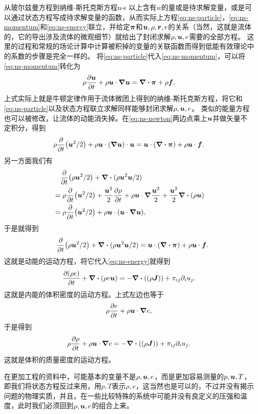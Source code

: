 \begin{back}{从玻尔兹曼方程到纳维-斯托克斯方程}{n-s}
    以上含有$w$的量或是待求解变量，或是可以通过状态方程写成待求解变量的函数，从而实际上方程\eqref{eq:ns-particle}，\eqref{eq:ns-momentum}和\eqref{eq:ns-energy}联立，并给定$\vb*{\pi}$和$\vb*{u}, \rho, \vb*{r}, e$的关系（当然，这就是流体的，它的导出涉及流体的微观细节）就给出了封闭求解$\rho, \vb*{u}, e$需要的全部方程。
    这里的过程和常规的场论计算中计算被积掉的变量的关联函数而得到低能有效理论中的系数的步骤是完全一样的。
    将\eqref{eq:ns-particle}代入\eqref{eq:ns-momentum}，可以将\eqref{eq:ns-momentum}转化为
    \begin{equation}
        \rho \pdv{\vb*{u}}{t} + \rho \vb*{u} \cdot \grad{\vb*{u}} = \div{\vb*{\pi}} + \rho \vb*{f},
        \label{eq:ns-newton}
    \end{equation}
    上式实际上就是牛顿定律作用于流体微团上得到的纳维-斯托克斯方程，将它和\eqref{eq:ns-particle}以及状态方程联立求解同样能够封闭求解$\rho, \vb*{u}, e$。
    类似的能量方程也可以被修改，让流体的动能消失掉。在\eqref{eq:ns-newton}两边点乘上$\vb*{u}$并做矢量不定积分，得到
    \[
        \rho \pdv{t}(\vb*{u}^2 / 2) + \rho \vb*{u} \cdot (\grad{\vb*{u}}) \cdot \vb*{u} = \vb*{u} \cdot (\div{\vb*{\pi}}) + \rho \vb*{u} \cdot \vb*{f}.
    \]
    另一方面我们有
    \[
        \begin{aligned}
            &\quad \pdv{t} (\rho \vb*{u}^2 / 2) + \div{(\rho \vb*{u}^2 \vb*{u} / 2)} \\
            &= \rho \pdv{t}(\vb*{u}^2 / 2) + \frac{\vb*{u}^2}{2} \pdv{\rho}{t} + \rho \vb*{u} \cdot \grad \frac{\vb*{u}^2}{2} + \frac{\vb*{u}^2}{2} \div{(\rho \vb*{u})} \\
            &= \rho \pdv{t}(\vb*{u}^2 / 2) + \rho \vb*{u} \cdot (\vb*{u} \cdot \grad \vb*{u}),
        \end{aligned}
    \]
    于是就得到
    \begin{equation}
        \quad \pdv{t} (\rho \vb*{u}^2 / 2) + \div{(\rho \vb*{u}^2 \vb*{u} / 2)} = \vb*{u} \cdot (\div{\vb*{\pi}}) + \rho \vb*{u} \cdot \vb*{f}.
    \end{equation}
    这就是动能的运动方程，将它代入\eqref{eq:ns-energy}就得到
    \begin{equation}
        \pdv{(\rho e)}{t} + \div{(\rho e \vb*{u})} = - \div((\rho \vb*{J})) + \pi_{ij} \partial_i u_j.
    \end{equation}
    这就是内能的体积密度的运动方程。上式左边也等于
    \[
        \rho \pdv{e}{t} + \rho \vb*{u} \cdot \grad e,
    \]
    于是得到
    \begin{equation}
        \rho \pdv{\rho}{t} + \rho \vb*{u} \cdot \grad e = - \div((\rho \vb*{J})) + \pi_{ij} \partial_i u_j.
    \end{equation}
    这就是体积的质量密度的运动方程。

    在更加工程的资料中，可能基本的变量不是$\rho, \vb*{u}, e$，而是更加容易测量的$p, \vb*{u}, T$，即我们将状态方程反过来用，用$p, T$表示$\rho, e$，这当然也是可以的，不过并没有揭示问题的物理实质，并且，在一些比较特殊的系统中可能并没有良定义的压强和温度，此时我们必须回到$\rho, \vb*{u}, e$的组合上来。
\end{back}